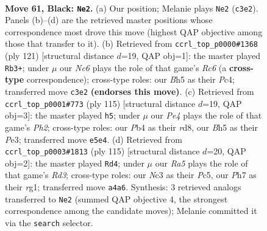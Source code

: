 \documentclass[11pt]{article}
\begin{document}
\clearpage

\begin{figure}[p]\centering
\begin{subfigure}{0.46\textwidth}\centering
\resizebox{\linewidth}{!}{%
\newchessgame
\chessboard[
  setfen={8/7p/1K2k3/4p2b/rp6/2n5/6r1/8 b - - 13 61},
  showmover=false,
  pgfstyle=straightmove, color=movearrow, markmove={c3-e2}
]}
\caption{}
\end{subfigure}\hfill
\begin{subfigure}{0.46\textwidth}\centering
\resizebox{\linewidth}{!}{%
\newchessgame
\chessboard[
  setfen={8/7P/k7/8/ppp5/2r5/7R/1K6 b - - 16 61},
  showmover=false,
  pgfstyle=straightmove, color=movearrow, markmove={c3-b3}
]}
\caption{}
\end{subfigure}
\\[4pt]
\begin{subfigure}{0.46\textwidth}\centering
\resizebox{\linewidth}{!}{%
\newchessgame
\chessboard[
  setfen={3R4/6kp/8/4r3/2K5/4pn2/1PP1N3/8 b - - 1 58},
  showmover=false,
  pgfstyle=straightmove, color=movearrow, markmove={h7-h5}
]}
\caption{}
\end{subfigure}\hfill
\begin{subfigure}{0.46\textwidth}\centering
\resizebox{\linewidth}{!}{%
\newchessgame
\chessboard[
  setfen={8/1kp5/3r4/2p5/2P5/4K3/8/6R1 b - - 9 58},
  showmover=false,
  pgfstyle=straightmove, color=movearrow, markmove={d6-d4}
]}
\caption{}
\end{subfigure}
\caption{\textbf{Move 61, Black: \texttt{Ne2}.} (a) Our position; Melanie plays \texttt{Ne2} (\texttt{c3e2}). Panels (b)--(d) are the retrieved master positions whose correspondence most drove this move (highest QAP objective among those that transfer to it). (b) Retrieved from \texttt{ccrl\_top\_p0000\#1368} (ply 121) [structural distance $d$=19, QAP obj=1]: the master played \texttt{Rb3+}; under $\mu$ our \emph{Nc6} plays the role of that game's \emph{Rc6} (a \textbf{cross-type} correspondence); cross-type roles: our \emph{B}h5 as their \emph{P}c4; transferred move \texttt{c3e2} \textbf{(endorses this move)}. (c) Retrieved from \texttt{ccrl\_top\_p0001\#773} (ply 115) [structural distance $d$=19, QAP obj=3]: the master played \texttt{h5}; under $\mu$ our \emph{Pe4} plays the role of that game's \emph{Ph2}; cross-type roles: our \emph{P}b4 as their \emph{r}d8, our \emph{B}h5 as their \emph{P}e3; transferred move \texttt{e5e4}. (d) Retrieved from \texttt{ccrl\_top\_p0003\#1813} (ply 115) [structural distance $d$=20, QAP obj=2]: the master played \texttt{Rd4}; under $\mu$ our \emph{Ra5} plays the role of that game's \emph{Rd3}; cross-type roles: our \emph{N}c3 as their \emph{P}c5, our \emph{P}h7 as their \emph{r}g1; transferred move \texttt{a4a6}. Synthesis: 3 retrieved analogs transferred to \texttt{Ne2} (summed QAP objective 4, the strongest correspondence among the candidate moves); Melanie committed it via the \texttt{search} selector.}
\label{fig:thought-m121}
\end{figure}
\end{document}
